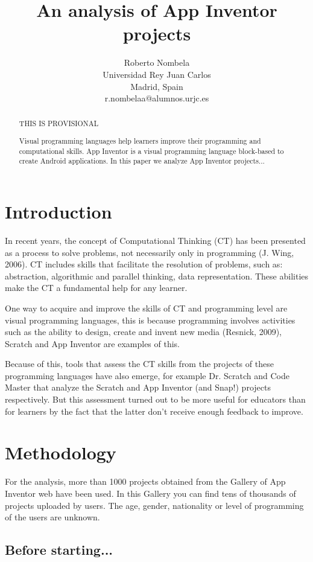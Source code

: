 \documentclass[a4paper]{article}
\title{An analysis of App Inventor projects}
\author{
Roberto Nombela \\ Universidad Rey Juan Carlos\\
                Madrid, Spain \\ r.nombelaa@alumnos.urjc.es
}
\begin{document}
\maketitle

\begin{abstract}
THIS IS PROVISIONAL

Visual programming languages help learners improve their programming and computational skills. App Inventor is a visual programming language block-based to create Android applications. In this paper we analyze App Inventor projects...
\end{abstract}


\section{Introduction}

In recent years, the concept of Computational Thinking (CT) has been presented as a process to solve problems, not necessarily only in programming (J. Wing, 2006). CT includes skills that facilitate the resolution of problems, such as: abstraction, algorithmic and parallel thinking, data representation. These abilities make the CT a fundamental help for any learner.

One way to acquire and improve the skills of CT and programming level are visual programming languages, this is because programming involves activities such as the ability to design, create and invent new media (Resnick, 2009), Scratch and App Inventor are examples of this.

Because of this, tools that assess the CT skills from the projects of these programming languages have also emerge, for example Dr. Scratch and Code Master that analyze the Scratch and App Inventor (and Snap!) projects respectively. But this assessment turned out to be more useful for educators than for learners by the fact that the latter don't receive enough feedback to improve.

\section{Methodology}

For the analysis, more than 1000 projects obtained from the Gallery of App Inventor web have been used. In this Gallery you can find tens of thousands of projects uploaded by users. The age, gender, nationality or level of programming of the users are unknown.

\subsection{Before starting...}
\end{document}
